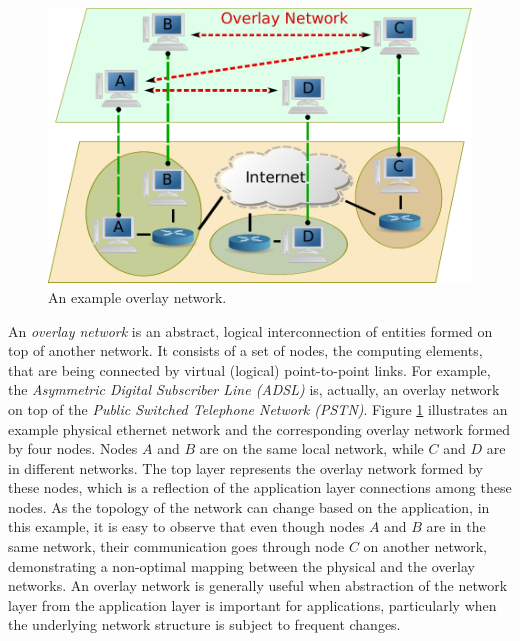 \documentclass[acmcsur]{acmtrans2m}
\begin{document}
\begin{figure}[h!]
\centering
  \includegraphics[scale=0.5]{img/p2p.pdf}
\caption{An example overlay network.}
\label{figure:overlay}
\end{figure}

An \emph{overlay network} is an abstract, logical interconnection of entities
formed on top of another network. It consists of a set of nodes, the computing
elements, that are being connected by virtual (logical) point-to-point links.
For example, the \emph{Asymmetric Digital Subscriber Line (ADSL)} is, actually,
an overlay network on top of the \emph{Public Switched Telephone Network
(PSTN)}. Figure \ref{figure:overlay} illustrates an example physical ethernet network
and the corresponding overlay network formed by four nodes. 
Nodes $A$ and $B$ are on the same local network, while $C$ and $D$ are in
different networks. The top layer represents the overlay network formed by these
nodes, which is a reflection of the application layer connections among these
nodes. As the topology of the network can change based on the application, in
this example, it is easy to observe that even though nodes $A$ and $B$ are in the same
network, their communication goes through node $C$ on another network,
demonstrating a non-optimal mapping between the physical and the overlay
networks.
An overlay network is generally useful when
abstraction of the network layer from the application layer is important for
applications, particularly when the underlying network structure is subject to
frequent changes.%
\end{document}
